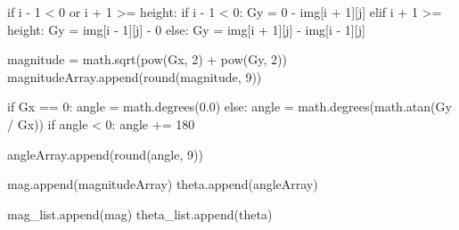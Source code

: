 \documentclass[
  letterpaper,
]{report}
\newenvironment{Shaded}{\begin{snugshade}}{\end{snugshade}}
\newcommand{\BuiltInTok}[1]{\textcolor[rgb]{0.00,0.23,0.31}{#1}}
\newcommand{\ControlFlowTok}[1]{\textcolor[rgb]{0.00,0.23,0.31}{#1}}
\newcommand{\DecValTok}[1]{\textcolor[rgb]{0.68,0.00,0.00}{#1}}
\newcommand{\FloatTok}[1]{\textcolor[rgb]{0.68,0.00,0.00}{#1}}
\newcommand{\KeywordTok}[1]{\textcolor[rgb]{0.00,0.23,0.31}{#1}}
\newcommand{\NormalTok}[1]{\textcolor[rgb]{0.00,0.23,0.31}{#1}}
\newcommand{\OperatorTok}[1]{\textcolor[rgb]{0.37,0.37,0.37}{#1}}
\begin{document}
\begin{Shaded}
\begin{Highlighting}[]
            \ControlFlowTok{if}\NormalTok{ i }\OperatorTok{{-}} \DecValTok{1} \OperatorTok{\textless{}} \DecValTok{0} \KeywordTok{or}\NormalTok{ i }\OperatorTok{+} \DecValTok{1} \OperatorTok{\textgreater{}=}\NormalTok{ height:}
                \ControlFlowTok{if}\NormalTok{ i }\OperatorTok{{-}} \DecValTok{1} \OperatorTok{\textless{}} \DecValTok{0}\NormalTok{:}
\NormalTok{                    Gy }\OperatorTok{=} \DecValTok{0} \OperatorTok{{-}}\NormalTok{ img[i }\OperatorTok{+} \DecValTok{1}\NormalTok{][j]}
                \ControlFlowTok{elif}\NormalTok{ i }\OperatorTok{+} \DecValTok{1} \OperatorTok{\textgreater{}=}\NormalTok{ height:}
\NormalTok{                    Gy }\OperatorTok{=}\NormalTok{ img[i }\OperatorTok{{-}} \DecValTok{1}\NormalTok{][j] }\OperatorTok{{-}} \DecValTok{0}
            \ControlFlowTok{else}\NormalTok{:}
\NormalTok{                Gy }\OperatorTok{=}\NormalTok{ img[i }\OperatorTok{+} \DecValTok{1}\NormalTok{][j] }\OperatorTok{{-}}\NormalTok{ img[i }\OperatorTok{{-}} \DecValTok{1}\NormalTok{][j]}
                
\NormalTok{            magnitude }\OperatorTok{=}\NormalTok{ math.sqrt(}\BuiltInTok{pow}\NormalTok{(Gx, }\DecValTok{2}\NormalTok{) }\OperatorTok{+} \BuiltInTok{pow}\NormalTok{(Gy, }\DecValTok{2}\NormalTok{))}
\NormalTok{            magnitudeArray.append(}\BuiltInTok{round}\NormalTok{(magnitude, }\DecValTok{9}\NormalTok{))}
            
            \ControlFlowTok{if}\NormalTok{ Gx }\OperatorTok{==} \DecValTok{0}\NormalTok{:}
\NormalTok{                angle }\OperatorTok{=}\NormalTok{ math.degrees(}\FloatTok{0.0}\NormalTok{)}
            \ControlFlowTok{else}\NormalTok{:}
\NormalTok{                angle }\OperatorTok{=}\NormalTok{ math.degrees(math.atan(Gy }\OperatorTok{/}\NormalTok{ Gx))}
                \ControlFlowTok{if}\NormalTok{ angle }\OperatorTok{\textless{}} \DecValTok{0}\NormalTok{:}
\NormalTok{                    angle }\OperatorTok{+=} \DecValTok{180}
                    
\NormalTok{            angleArray.append(}\BuiltInTok{round}\NormalTok{(angle, }\DecValTok{9}\NormalTok{))}
            
\NormalTok{        mag.append(magnitudeArray)}
\NormalTok{        theta.append(angleArray)}
        
\NormalTok{    mag\_list.append(mag)}
\NormalTok{    theta\_list.append(theta)}
\end{Highlighting}
\end{Shaded}
\end{document}
